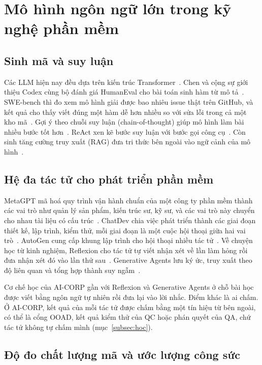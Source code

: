 \section{Mô hình ngôn ngữ lớn trong kỹ nghệ phần mềm}

\subsection{Sinh mã và suy luận}

Các LLM hiện nay đều dựa trên kiến trúc Transformer~\cite{vaswani2017}. Chen và cộng sự giới thiệu Codex cùng bộ đánh giá HumanEval cho bài toán sinh hàm từ mô tả~\cite{chen2021}. SWE-bench thì đo xem mô hình giải được bao nhiêu issue thật trên GitHub, và kết quả cho thấy viết đúng một hàm dễ hơn nhiều so với sửa lỗi trong cả một kho mã~\cite{jimenez2024}. Gợi ý theo chuỗi suy luận (chain-of-thought) giúp mô hình làm bài nhiều bước tốt hơn~\cite{wei2022}. ReAct xen kẽ bước suy luận với bước gọi công cụ~\cite{yao2023}. Còn sinh tăng cường truy xuất (RAG) đưa tri thức bên ngoài vào ngữ cảnh của mô hình~\cite{lewis2020}.

\subsection{Hệ đa tác tử cho phát triển phần mềm}

MetaGPT mã hoá quy trình vận hành chuẩn của một công ty phần mềm thành các vai trò như quản lý sản phẩm, kiến trúc sư, kỹ sư, và các vai trò này chuyển cho nhau tài liệu có cấu trúc~\cite{hong2024}. ChatDev chia việc phát triển thành các giai đoạn thiết kế, lập trình, kiểm thử, mỗi giai đoạn là một cuộc hội thoại giữa hai vai trò~\cite{qian2024}. AutoGen cung cấp khung lập trình cho hội thoại nhiều tác tử~\cite{wu2023}. Về chuyện học từ kinh nghiệm, Reflexion cho tác tử tự viết nhận xét về lần làm hỏng rồi đưa nhận xét đó vào lần thử sau~\cite{shinn2023}. Generative Agents lưu ký ức, truy xuất theo độ liên quan và tổng hợp thành suy ngẫm~\cite{park2023}.

Cơ chế học của AI-CORP gần với Reflexion và Generative Agents ở chỗ bài học được viết bằng ngôn ngữ tự nhiên rồi đưa lại vào lời nhắc. Điểm khác là ai chấm. Ở AI-CORP, kết quả của mỗi tác tử được chấm bằng một tín hiệu từ bên ngoài, có thể là cổng OOAD, kết quả kiểm thử của QC hoặc phán quyết của QA, chứ tác tử không tự chấm mình (mục~\ref{subsec:hoc}).

\subsection{Độ đo chất lượng mã và ước lượng công sức}

